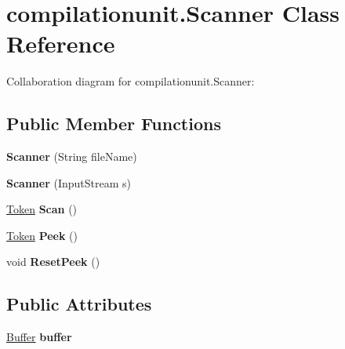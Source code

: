 \hypertarget{classcompilationunit_1_1_scanner}{
\section{compilationunit.Scanner Class Reference}
\label{classcompilationunit_1_1_scanner}
}


Collaboration diagram for compilationunit.Scanner:
\subsection*{Public Member Functions}
\begin{DoxyCompactItemize}
\item 
\hypertarget{classcompilationunit_1_1_scanner_af2acf0127f0b98a04d4a267d0472158b}{
{\bfseries Scanner} (String fileName)}
\label{classcompilationunit_1_1_scanner_af2acf0127f0b98a04d4a267d0472158b}

\item 
\hypertarget{classcompilationunit_1_1_scanner_a74f767672fca6ab6efc80fb1ab49b96d}{
{\bfseries Scanner} (InputStream s)}
\label{classcompilationunit_1_1_scanner_a74f767672fca6ab6efc80fb1ab49b96d}

\item 
\hypertarget{classcompilationunit_1_1_scanner_a122ee9657687826d098278a5966663ee}{
\hyperlink{classcompilationunit_1_1_token}{Token} {\bfseries Scan} ()}
\label{classcompilationunit_1_1_scanner_a122ee9657687826d098278a5966663ee}

\item 
\hypertarget{classcompilationunit_1_1_scanner_a41d535d3cdfda545dd6ecc9df4d30947}{
\hyperlink{classcompilationunit_1_1_token}{Token} {\bfseries Peek} ()}
\label{classcompilationunit_1_1_scanner_a41d535d3cdfda545dd6ecc9df4d30947}

\item 
\hypertarget{classcompilationunit_1_1_scanner_a1781e29fc56b96a17264414e4e7f8202}{
void {\bfseries ResetPeek} ()}
\label{classcompilationunit_1_1_scanner_a1781e29fc56b96a17264414e4e7f8202}

\end{DoxyCompactItemize}
\subsection*{Public Attributes}
\begin{DoxyCompactItemize}
\item 
\hypertarget{classcompilationunit_1_1_scanner_afd70fcc44bd6160524c2ee7defd1e915}{
\hyperlink{classcompilationunit_1_1_buffer}{Buffer} {\bfseries buffer}}
\label{classcompilationunit_1_1_scanner_afd70fcc44bd6160524c2ee7defd1e915}

\end{DoxyCompactItemize}

